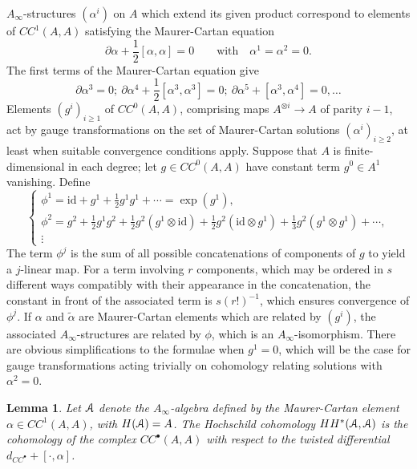 \documentclass[reqno,10pt]{amsart}
\numberwithin{equation}{section}
\newcommand{\scrA}{\EuScript{A}}
\newtheorem{Lemma}[thm]{Lemma}
\theoremstyle{remark}
\begin{document}
  $A_{\infty}$-structures $(\alpha^i)$ on $A$ which extend its given product correspond to elements of $CC^{1}(A,A)$ satisfying the Maurer-Cartan equation
\begin{equation} \label{Eqn:Maurer-Cartan}
\partial \alpha + \frac{1}{2} [\alpha, \alpha] = 0\qquad \textrm{with} \quad \alpha^1 = \alpha^2 = 0.
\end{equation}
The first terms of the Maurer-Cartan equation give
\begin{equation} \label{Eqn:Maurer-Cartan-FirstTerms}
\partial \alpha^3 = 0; \ \partial \alpha^4 + \frac{1}{2}[\alpha^3,\alpha^3]=0; \ \partial \alpha^5 + [\alpha^3,\alpha^4]=0, \ldots
\end{equation}
Elements $(g^i)_{i\geq 1}$ of $CC^0(A,A)$, comprising maps $A^{\otimes i} \rightarrow A$ of parity $i-1$,   act by gauge transformations on the set of Maurer-Cartan solutions $(\alpha^i)_{i\geq 2}$, at least when suitable convergence conditions apply.   Suppose that $A$ is finite-dimensional in each degree; let $g \in CC^0(A,A)$ have constant term $g^0 \in A^1$ vanishing. Define
\begin{equation} \label{Eqn:exp-gamma}
\begin{cases}
\phi^1 = \mathrm{id} + g^1 + \frac{1}{2}g^1 g^1 + \cdots = \exp(g^1), \\
\phi^2 = g^2 + \frac{1}{2} g^1 g^2 + \frac{1}{2} g^2(g^1 \otimes \mathrm{id}) +
\frac{1}{2} g^2(\mathrm{id} \otimes g^1) + \textstyle\frac{1}{3} g^2(g^1 \otimes g^1) + \cdots, \\
\vdots
\end{cases}
\end{equation}
The term $\phi^j$ is the sum of all possible concatenations of components of $g$ to yield a $j$-linear map. For a term involving $r$ components, which may be ordered in $s$ different ways compatibly with their appearance in the concatenation,  the constant in front of the associated term is $s(r!)^{-1}$, which  ensures convergence of $\phi^j$.   If $\alpha$ and $\tilde\alpha$ are Maurer-Cartan elements which are related by $(g^i)$, the associated $A_\infty$-structures  are related by $\phi$, which is an $A_\infty$-isomorphism. There are obvious simplifications to the formulae when $g^1=0$, which will be the case for gauge transformations acting trivially on cohomology relating solutions with $\alpha^2=0$.



\begin{Lemma} \label{Lem:DeformedHH}
Let $\scrA$ denote the $A_{\infty}$-algebra defined by the Maurer-Cartan element $\alpha \in CC^1(A,A)$, with $H(\scrA) = A$.  The Hochschild cohomology $HH^*(\scrA,\scrA)$ is the cohomology of the complex $CC^{\bullet}(A,A)$ with respect to the twisted differential $d_{CC^{\bullet}} + [\cdot, \alpha]$.
\end{Lemma}
\end{document}
